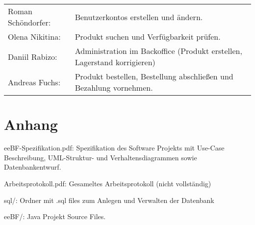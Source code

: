 \documentclass[a4paper]{article}
\begin{document}
\renewcommand{\arraystretch}{1.3}
\begin{tabular}{lp{8cm}}
	Roman Schöndorfer: 	& Benutzerkontos erstellen und ändern.\\
	Olena Nikitina:		& Produkt suchen und Verfügbarkeit prüfen.\\
	Daniil Rabizo: 		& Administration im Backoffice (Produkt erstellen, Lagerstand korrigieren)\\
	Andreas Fuchs: 		& Produkt bestellen, Bestellung abschließen und Bezahlung vornehmen.\\
\end{tabular}

\section*{Anhang}
\begin{description}
	\item eeBF-Spezifikation.pdf: Spezifikation des Software Projekts mit Use-Case Beschreibung, UML-Struktur- und Verhaltensdiagrammen sowie Datenbankentwurf.
	\item Arbeitsprotokoll.pdf: Gesameltes Arbeitsprotokoll (nicht vollständig)
	\item sql/: Ordner mit .sql files zum Anlegen und Verwalten der Datenbank
	\item eeBF/: Java Projekt Source Files.
\end{description}
\end{document}
